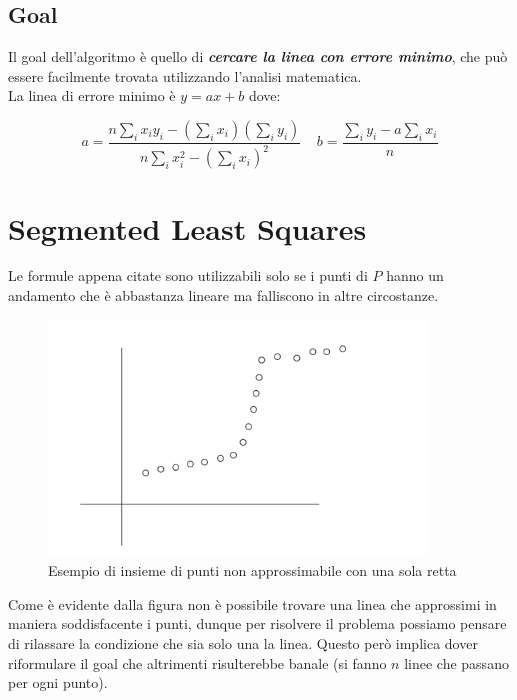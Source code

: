 \subsection{Goal}

Il goal dell'algoritmo è quello di \textbf{\emph{cercare la linea con
    errore minimo}}, che può essere facilmente trovata utilizzando
l'analisi matematica.\\

La linea di errore minimo è $y = ax + b$ dove:

$$
  a = \frac{n \sum_{i} x_i y_i - (\sum_{i} x_i) (\sum_{i} y_i)}{n \sum_{i} x_i^2 - (\sum_{i} x_i)^2} \ \ \  \ \ b = \frac{\sum_{i} y_i - a \sum_{i} x_i}{n}
$$

\section{Segmented Least Squares}

Le formule appena citate sono utilizzabili solo se i punti di $P$
hanno un andamento che è abbastanza lineare ma falliscono in altre
circostanze.

\begin{figure}[H]
  \centering
  \includegraphics[width = 10cm, keepaspectratio]{capitoli/programmazione_dinamica/imgs/seg_llsqr.png}
  \caption{Esempio di insieme di punti non approssimabile con una sola retta}
\end{figure}

Come è evidente dalla figura non è possibile trovare una linea che
approssimi in maniera soddisfacente i punti, dunque per risolvere il
problema possiamo pensare di rilassare la condizione che sia solo una la
linea. Questo però implica dover riformulare il goal che altrimenti
risulterebbe banale (si fanno $n$ linee che passano per ogni punto).

